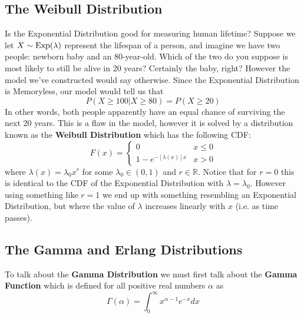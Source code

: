 \subsection{The Weibull Distribution}
Is the Exponential Distribution good for measuring human lifetime? Suppose we let $X\sim \textup{Exp}(\lambda)$ represent the lifespan of a person, and imagine we have two people: newborn baby and an 80-year-old. Which of the two do you suppose is most likely to still be alive in 20 years? Certainly the baby, right? However the model we've constructed would say otherwise. Since the Exponential Distribution is Memoryless, our model would tell us that
\[
    P(X\ge 100 | X \ge 80) = P(X\ge 20)
\]
In other words, both people apparently have an equal chance of surviving the next 20 years. This is a flaw in the model, however it is solved by a distribution known as the \textbf{Weibull Distribution} which has the following CDF:
\[
    F(x) = 
    \begin{cases}
        0 & x \le 0
        \\
        1-e^{-[\lambda(x)]x} & x > 0
    \end{cases}
\]
where $\lambda(x)=\lambda_0 x^r$ for some $\lambda_0\in(0,1)$ and $r\in\mathbb R$. Notice that for $r=0$ this is identical to the CDF of the Exponential Distribution with $\lambda =\lambda_0$. However using something like $r=1$ we end up with something resembling an Exponential Distribution, but where the value of $\lambda$ increases linearly with $x$ (i.e. as time passes).  


\subsection{The Gamma and Erlang Distributions}
\newcommand{\gam}{\textup{Gam}}
To talk about the \textbf{Gamma Distribution} we must first talk about the \textbf{Gamma Function} which is defined for all positive real numbers $\alpha$ as
\[
    \Gamma(\alpha)=\int_0^\infty x^{\alpha - 1} e^{-x} dx
\]

